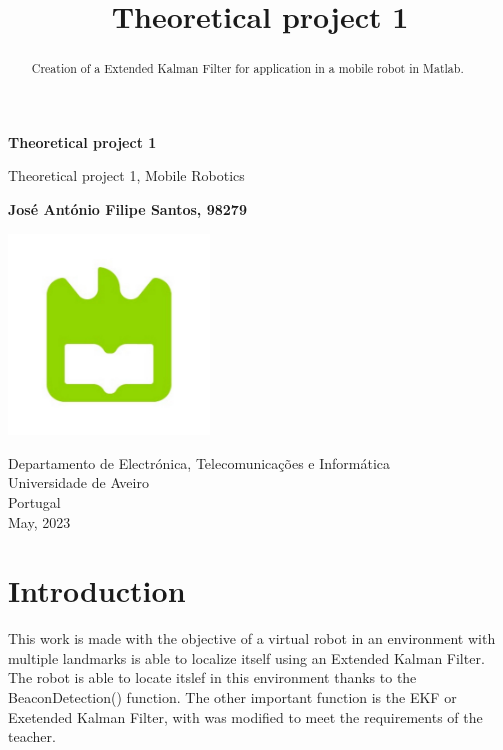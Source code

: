 \documentclass[runningheads]{llncs}
\begin{document}
%

\begin{titlepage}
   \begin{center}
       \vspace*{1cm}

       \textbf{Theoretical project 1}

       \vspace{0.5cm}
        Theoretical project 1,   Mobile Robotics
            
       \vspace{1.5cm}

       \textbf{José António Filipe Santos, 98279} 
       \vfill

            
       \vspace{0.8cm}
     
       \includegraphics[width=0.4\textwidth]{logo.jpg}
            
       Departamento de Electrónica, Telecomunicações e Informática\\
        Universidade de Aveiro\\
       Portugal\\
       May, 2023


            
   \end{center}
\end{titlepage}



\title{Theoretical project 1}
\begin{abstract}
Creation of a Extended Kalman Filter for application in a mobile robot in Matlab.
\end{abstract}
%
%
%
\section{Introduction}
This work is made with the objective of a virtual robot in an environment with multiple landmarks is 
able to localize itself using an Extended Kalman Filter. The robot is able to locate itslef in this environment 
thanks to the BeaconDetection() function. The other important function is the EKF or Exetended Kalman Filter,
with was modified to meet the requirements of the teacher.
\end{document}
